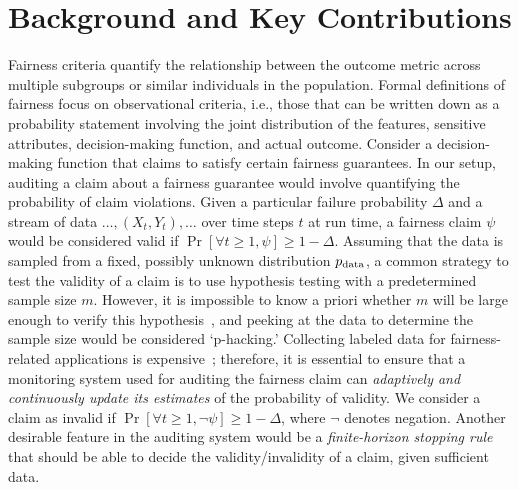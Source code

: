 \section{Background and Key Contributions}

Fairness criteria quantify the relationship between the outcome metric across multiple subgroups or similar individuals in the population.
Formal definitions of fairness focus on observational criteria, i.e., those that can be written down as a probability statement involving the joint distribution of the features, sensitive attributes, decision-making function, and actual outcome.
Consider a decision-making function that claims to satisfy certain fairness guarantees.
In our setup, auditing a claim about a fairness guarantee would involve quantifying the probability of claim violations.
Given a particular failure probability $\Delta$ and a stream of data $\dots, (X_t, Y_t), \dots$ over time steps $t$ at run time, a fairness claim $\psi$ would be considered valid if $\Pr[\forall t \geq 1, \psi] \geq 1 - \Delta $.
Assuming that the data is sampled from a fixed, possibly unknown distribution $p_{\rm{data}}$, a common strategy to test the validity of a claim is to use hypothesis testing with a predetermined sample size $m$.
However, it is impossible to know a priori whether $m$ will be large enough to verify this hypothesis~\citep{waudby2021time}, and peeking at the data to determine the sample size would be considered `p-hacking.'
Collecting labeled data for fairness-related applications is expensive~\citep{ji2020can}; therefore, it is essential to ensure that a monitoring system used for auditing the fairness claim can \textit{adaptively and continuously update its estimates} of the probability of validity.
We consider a claim as invalid if $\Pr[\forall t \geq 1, \neg \psi] \geq 1 - \Delta$, where $\neg$ denotes negation.
Another desirable feature in the auditing system would be a \textit{finite-horizon stopping rule} that should be able to decide the validity/invalidity of a claim, given sufficient data.

